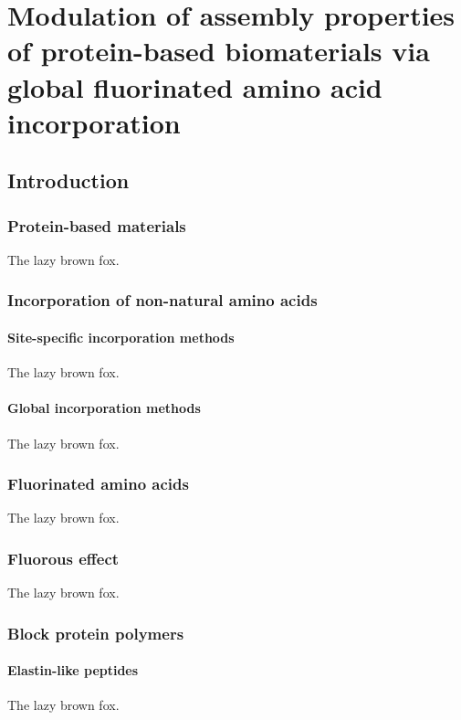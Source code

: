 \chapter{Modulation of assembly properties of protein-based biomaterials via global fluorinated amino acid incorporation}
\section{Introduction}

\subsection{Protein-based materials}
The lazy brown fox.

\subsection{Incorporation of non-natural amino acids}
\subsubsection{Site-specific incorporation methods}
The lazy brown fox.
\subsubsection{Global incorporation methods}
The lazy brown fox.

\subsection{Fluorinated amino acids}
The lazy brown fox.

\subsection{Fluorous effect}
The lazy brown fox.

\subsection{Block protein polymers}
\subsubsection{Elastin-like peptides}
The lazy brown fox.

